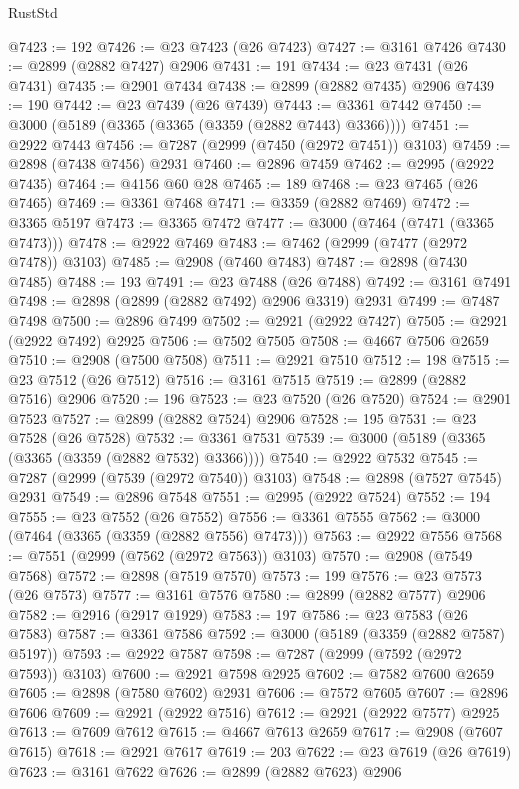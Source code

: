 \begin{lexlean}{RustStd}
\begin{coremodule}
@7423 := 192
@7426 := @23 @7423 (@26 @7423)
@7427 := @3161 @7426
@7430 := @2899 (@2882 @7427) @2906
@7431 := 191
@7434 := @23 @7431 (@26 @7431)
@7435 := @2901 @7434
@7438 := @2899 (@2882 @7435) @2906
@7439 := 190
@7442 := @23 @7439 (@26 @7439)
@7443 := @3361 @7442
@7450 := @3000 (@5189 (@3365 (@3365 (@3359 (@2882 @7443) @3366))))
@7451 := @2922 @7443
@7456 := @7287 (@2999 (@7450 (@2972 @7451)) @3103)
@7459 := @2898 (@7438 @7456) @2931
@7460 := @2896 @7459
@7462 := @2995 (@2922 @7435)
@7464 := @4156 @60 @28
@7465 := 189
@7468 := @23 @7465 (@26 @7465)
@7469 := @3361 @7468
@7471 := @3359 (@2882 @7469)
@7472 := @3365 @5197
@7473 := @3365 @7472
@7477 := @3000 (@7464 (@7471 (@3365 @7473)))
@7478 := @2922 @7469
@7483 := @7462 (@2999 (@7477 (@2972 @7478)) @3103)
@7485 := @2908 (@7460 @7483)
@7487 := @2898 (@7430 @7485)
@7488 := 193
@7491 := @23 @7488 (@26 @7488)
@7492 := @3161 @7491
@7498 := @2898 (@2899 (@2882 @7492) @2906 @3319) @2931
@7499 := @7487 @7498
@7500 := @2896 @7499
@7502 := @2921 (@2922 @7427)
@7505 := @2921 (@2922 @7492) @2925
@7506 := @7502 @7505
@7508 := @4667 @7506 @2659
@7510 := @2908 (@7500 @7508)
@7511 := @2921 @7510
@7512 := 198
@7515 := @23 @7512 (@26 @7512)
@7516 := @3161 @7515
@7519 := @2899 (@2882 @7516) @2906
@7520 := 196
@7523 := @23 @7520 (@26 @7520)
@7524 := @2901 @7523
@7527 := @2899 (@2882 @7524) @2906
@7528 := 195
@7531 := @23 @7528 (@26 @7528)
@7532 := @3361 @7531
@7539 := @3000 (@5189 (@3365 (@3365 (@3359 (@2882 @7532) @3366))))
@7540 := @2922 @7532
@7545 := @7287 (@2999 (@7539 (@2972 @7540)) @3103)
@7548 := @2898 (@7527 @7545) @2931
@7549 := @2896 @7548
@7551 := @2995 (@2922 @7524)
@7552 := 194
@7555 := @23 @7552 (@26 @7552)
@7556 := @3361 @7555
@7562 := @3000 (@7464 (@3365 (@3359 (@2882 @7556) @7473)))
@7563 := @2922 @7556
@7568 := @7551 (@2999 (@7562 (@2972 @7563)) @3103)
@7570 := @2908 (@7549 @7568)
@7572 := @2898 (@7519 @7570)
@7573 := 199
@7576 := @23 @7573 (@26 @7573)
@7577 := @3161 @7576
@7580 := @2899 (@2882 @7577) @2906
@7582 := @2916 (@2917 @1929)
@7583 := 197
@7586 := @23 @7583 (@26 @7583)
@7587 := @3361 @7586
@7592 := @3000 (@5189 (@3359 (@2882 @7587) @5197))
@7593 := @2922 @7587
@7598 := @7287 (@2999 (@7592 (@2972 @7593)) @3103)
@7600 := @2921 @7598 @2925
@7602 := @7582 @7600 @2659
@7605 := @2898 (@7580 @7602) @2931
@7606 := @7572 @7605
@7607 := @2896 @7606
@7609 := @2921 (@2922 @7516)
@7612 := @2921 (@2922 @7577) @2925
@7613 := @7609 @7612
@7615 := @4667 @7613 @2659
@7617 := @2908 (@7607 @7615)
@7618 := @2921 @7617
@7619 := 203
@7622 := @23 @7619 (@26 @7619)
@7623 := @3161 @7622
@7626 := @2899 (@2882 @7623) @2906

\end{coremodule}
\end{lexlean}
